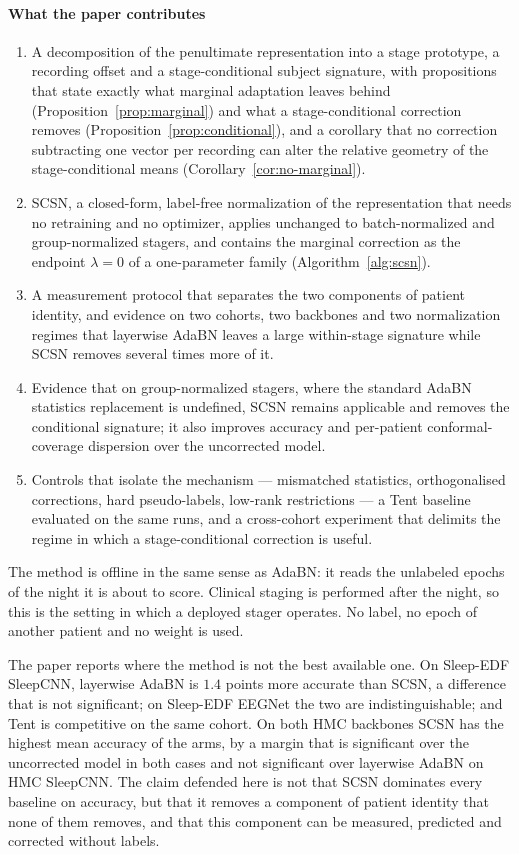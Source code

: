 \paragraph{What the paper contributes}
\begin{enumerate}
  \item A decomposition of the penultimate representation into a stage
  prototype, a recording offset and a stage-conditional subject signature,
  with propositions that state exactly what marginal adaptation leaves behind
  (Proposition~\ref{prop:marginal}) and what a stage-conditional correction
  removes (Proposition~\ref{prop:conditional}), and a corollary that no
  correction subtracting one vector per recording can alter the relative
  geometry of the stage-conditional means
  (Corollary~\ref{cor:no-marginal}).
  \item SCSN, a closed-form, label-free normalization of the representation
  that needs no retraining and no optimizer, applies unchanged to
  batch-normalized and group-normalized stagers, and contains the marginal
  correction as the endpoint $\lambda=0$ of a one-parameter family
  (Algorithm~\ref{alg:scsn}).
  \item A measurement protocol that separates the two components of patient
  identity, and evidence on two cohorts, two backbones and two normalization
  regimes that layerwise AdaBN leaves a large within-stage signature while
  SCSN removes several times more of it.
  \item Evidence that on group-normalized stagers, where the standard AdaBN
  statistics replacement is undefined, SCSN remains applicable and removes
  the conditional signature; it also improves accuracy and per-patient
  conformal-coverage dispersion over the uncorrected model.
  \item Controls that isolate the mechanism --- mismatched statistics,
  orthogonalised corrections, hard pseudo-labels, low-rank restrictions ---
  a Tent baseline evaluated on the same runs, and a cross-cohort experiment
  that delimits the regime in which a stage-conditional correction is useful.
\end{enumerate}

The method is offline in the same sense as AdaBN: it reads the unlabeled
epochs of the night it is about to score. Clinical staging is performed after
the night, so this is the setting in which a deployed stager operates. No
label, no epoch of another patient and no weight is used.

The paper reports where the method is not the best available one. On
Sleep-EDF SleepCNN, layerwise AdaBN is $1.4$ points more accurate than SCSN,
a difference that is not significant; on Sleep-EDF EEGNet the two are
indistinguishable; and Tent is competitive on the same cohort. On both HMC
backbones SCSN has the highest mean accuracy of the arms, by a margin that is
significant over the uncorrected model in both cases and not significant over
layerwise AdaBN on HMC SleepCNN. The claim defended here is not that
SCSN dominates every baseline on accuracy, but that it removes a component of
patient identity that none of them removes, and that this component can be
measured, predicted and corrected without labels.

